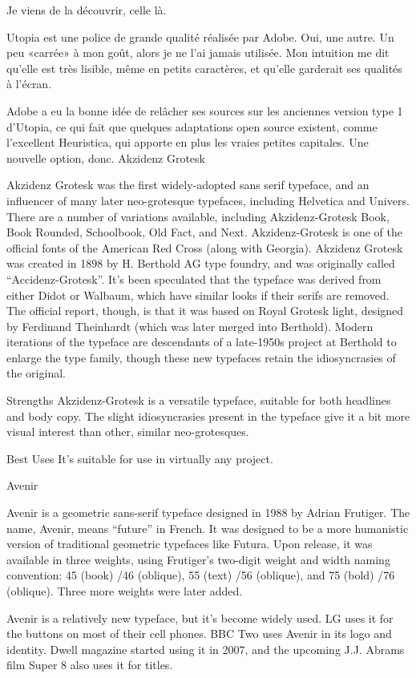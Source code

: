 \documentclass[12pt,a4paper,twocolumn]{book} %
\begin{document}
Je viens de la découvrir, celle là.

Utopia est une police de grande qualité réalisée par Adobe. Oui, une autre. Un peu «carrée» à mon goût, alors je ne l’ai jamais utilisée. Mon intuition me dit qu’elle est très lisible, même en petits caractères, et qu’elle garderait ses qualités à l’écran.

Adobe a eu la bonne idée de relâcher ses sources sur les anciennes version type 1 d’Utopia, ce qui fait que quelques adaptations open source existent, comme l’excellent Heuristica, qui apporte en plus les vraies petites capitales. Une nouvelle option, donc.
Akzidenz Grotesk

Akzidenz Grotesk was the first widely-adopted sans serif typeface, and an influencer of many later neo-grotesque typefaces, including Helvetica and Univers. There are a number of variations available, including Akzidenz-Grotesk Book, Book Rounded, Schoolbook, Old Fact, and Next. Akzidenz-Grotesk is one of the official fonts of the American Red Cross (along with Georgia).
Akzidenz Grotesk was created in 1898 by H. Berthold AG type foundry, and was originally called “Accidenz-Grotesk”. It’s been speculated that the typeface was derived from either Didot or Walbaum, which have similar looks if their serifs are removed. The official report, though, is that it was based on Royal Grotesk light, designed by Ferdinand Theinhardt (which was later merged into Berthold). Modern iterations of the typeface are descendants of a late-1950s project at Berthold to enlarge the type family, though these new typefaces retain the idiosyncrasies of the original.

Strengths
Akzidenz-Grotesk is a versatile typeface, suitable for both headlines and body copy. The slight idiosyncrasies present in the typeface give it a bit more visual interest than other, similar neo-grotesques.

Best Uses
It’s suitable for use in virtually any project.

 
Avenir

Avenir is a geometric sans-serif typeface designed in 1988 by Adrian Frutiger. The name, Avenir, means “future” in French. It was designed to be a more humanistic version of traditional geometric typefaces like Futura. Upon release, it was available in three weights, using Frutiger’s two-digit weight and width naming convention: 45 (book) /46 (oblique), 55 (text) /56 (oblique), and 75 (bold) /76 (oblique). Three more weights were later added.

Avenir is a relatively new typeface, but it’s become widely used. LG uses it for the buttons on most of their cell phones. BBC Two uses Avenir in its logo and identity. Dwell magazine started using it in 2007, and the upcoming J.J. Abrams film Super 8 also uses it for titles.
\end{document}
